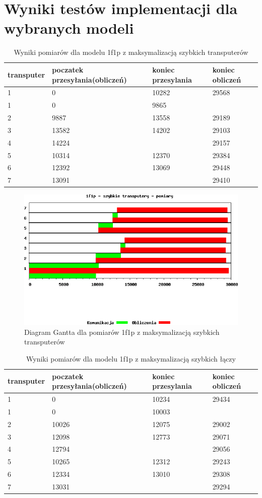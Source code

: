 \documentclass[a4paper,11pt, titlepage]{article}
\begin{document}
\section{Wyniki testów implementacji dla wybranych modeli}
\begin{table}[hp!]
\begin{tabular}{|l|l|l|l|}\hline
transputer & poczatek przesyłania(obliczeń) & koniec przesylania & koniec obliczeń\\ \hline
1 & 0 & 10282 & 29568\\ \hline
1 & 0 & 9865  & \\ \hline
2 & 9887 & 13558 & 29189\\ \hline
3 & 13582 & 14202 & 29103\\ \hline
4 & 14224 & & 29157\\ \hline
5 & 10314 & 12370 & 29384\\ \hline
6 & 12392 & 13069 & 29448\\	\hline
7 & 13091 & & 29410\\ \hline
\end{tabular}
\caption{Wyniki pomiarów dla modelu 1f1p z maksymalizacją szybkich transputerów \label{i1f1p_p}}
\end{table}
\begin{figure}[p!]
\includegraphics[width=1.0\textwidth]{wykresy/i1p1f_proc}
\caption{Diagram Gantta dla pomiarów 1f1p z maksymalizacją szybkich transputerów \label{i1p1f_pg}}
\end{figure}
\begin{table}[p!]
\begin{tabular}{|l|l|l|l|}\hline
transputer & poczatek przesyłania(obliczeń) & koniec przesylania & koniec obliczeń\\ \hline
1&0&10234&29434\\ \hline
1&0&10003&\\ \hline
2&10026&12075&29002\\ \hline
3&12098&12773&29071\\ \hline
4&12794&&29056\\ \hline
5&10265&12312&29243\\ \hline
6&12334&13010&29308\\ \hline
7&13031&&29294\\ \hline
\end{tabular}
\caption{Wyniki pomiarów dla modelu 1f1p z maksymalizacją szybkich łączy \label{i1f1p_l}}
\end{table}
\end{document}
